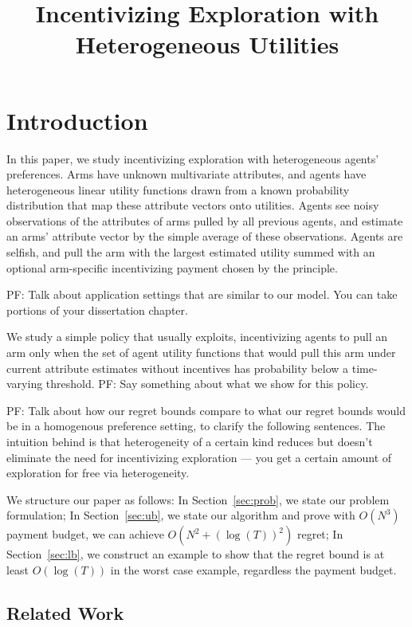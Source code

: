 \documentclass{article}
\title{Incentivizing Exploration with Heterogeneous Utilities}
\newcommand{\pfcomment}[1]{{\color{blue}PF: #1}}
\begin{document}
\maketitle


\section{Introduction}
In this paper, we study incentivizing exploration with heterogeneous agents' preferences.
Arms have unknown multivariate attributes, and agents have heterogeneous linear utility functions drawn from a known probability distribution that map these attribute vectors onto utilities. Agents see noisy observations of the attributes of arms pulled by all previous agents, and estimate an arms' attribute vector by the simple average of these observations.  Agents are selfish, and pull the arm with the largest estimated utility summed with an optional arm-specific incentivizing payment chosen by the principle.

\pfcomment{Talk about application settings that are similar to our model.  You can take portions of your dissertation chapter.}

We study a simple policy that usually exploits, incentivizing agents to pull an arm only when the set of agent utility functions that would pull this arm under current attribute estimates without incentives has probability below a time-varying threshold.  \pfcomment{Say something about what we show for this policy.}

\pfcomment{Talk about how our regret bounds compare to what our regret bounds would be in a homogenous preference setting, to clarify the following sentences.}
The intuition behind is that heterogeneity of a certain kind reduces but doesn't eliminate the need for incentivizing exploration --- you get a certain amount of exploration for free via heterogeneity.

We structure our paper as follows: In Section~\ref{sec:prob}, we state our problem formulation; In Section~\ref{sec:ub}, we state our algorithm and prove with $O(N^3)$ payment budget, we can achieve $O(N^2+(\log(T))^2)$ regret; In Section~\ref{sec:lb}, we construct an example to show that the regret bound is at least $O(\log(T))$ in the worst case example, regardless the payment budget.


\subsection{Related Work}
\end{document}
